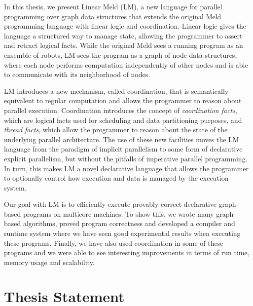 In this thesis, we present Linear Meld (LM), a new language for parallel
programming over graph data structures that extends the original Meld
programming language with linear logic and coordination. Linear logic gives the
language a structured way to manage state, allowing the programmer to assert and
retract logical facts.  While the original Meld sees a running program as an
ensemble of robots, LM sees the program as a graph of node data structures,
where each node performs computation independently of other nodes and is able to
communicate with its neighborhood of nodes.

LM introduces a new mechanism, called coordination, that is semantically
equivalent to regular computation and allows the programmer to reason about
parallel execution. Coordination introduces the concept of \emph{coordination
facts}, which are logical facts used for scheduling and data partitioning
purposes, and \emph{thread facts}, which allow the programmer to reason about
the state of the underlying parallel architecture. The use of these new
facilities moves the LM language from the paradigm of implicit parallelism to
some form of declarative explicit parallelism, but without the pitfalls of
imperative parallel programming. In turn, this makes LM a novel declarative
language that allows the programmer to optionally control how execution and data
is managed by the execution system.

Our goal with LM is to efficiently execute provably correct declarative
graph-based programs on multicore machines. To show this, we wrote many
graph-based algorithms, proved program correctness and developed a compiler and
runtime system where we have seen good experimental results when executing these
programs. Finally, we have also used coordination in some of these programs and
we were able to see interesting improvements in terms of run time, memory usage
and scalability.

\section{Thesis Statement}



